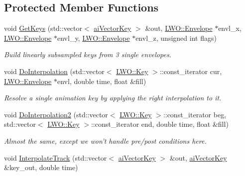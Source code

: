 \subsection*{Protected Member Functions}
\begin{DoxyCompactItemize}
\item 
void \hyperlink{class_assimp_1_1_l_w_o_1_1_anim_resolver_a76d2885a28167f149d5fc10742e60f05}{Get\+Keys} (std\+::vector$<$ \hyperlink{structai_vector_key}{ai\+Vector\+Key} $>$ \&out, \hyperlink{struct_assimp_1_1_l_w_o_1_1_envelope}{L\+W\+O\+::\+Envelope} $\ast$envl\+\_\+x, \hyperlink{struct_assimp_1_1_l_w_o_1_1_envelope}{L\+W\+O\+::\+Envelope} $\ast$envl\+\_\+y, \hyperlink{struct_assimp_1_1_l_w_o_1_1_envelope}{L\+W\+O\+::\+Envelope} $\ast$envl\+\_\+z, unsigned int flags)
\begin{DoxyCompactList}\small\item\em Build linearly subsampled keys from 3 single envelopes. \end{DoxyCompactList}\item 
void \hyperlink{class_assimp_1_1_l_w_o_1_1_anim_resolver_a9af2ed1a4667b425ac46440c182a3f74}{Do\+Interpolation} (std\+::vector$<$ \hyperlink{struct_assimp_1_1_l_w_o_1_1_key}{L\+W\+O\+::\+Key} $>$\+::const\+\_\+iterator cur, \hyperlink{struct_assimp_1_1_l_w_o_1_1_envelope}{L\+W\+O\+::\+Envelope} $\ast$envl, double time, float \&fill)
\begin{DoxyCompactList}\small\item\em Resolve a single animation key by applying the right interpolation to it. \end{DoxyCompactList}\item 
void \hyperlink{class_assimp_1_1_l_w_o_1_1_anim_resolver_a836e5acf927a945537e446b7e61aa5ee}{Do\+Interpolation2} (std\+::vector$<$ \hyperlink{struct_assimp_1_1_l_w_o_1_1_key}{L\+W\+O\+::\+Key} $>$\+::const\+\_\+iterator beg, std\+::vector$<$ \hyperlink{struct_assimp_1_1_l_w_o_1_1_key}{L\+W\+O\+::\+Key} $>$\+::const\+\_\+iterator end, double time, float \&fill)
\begin{DoxyCompactList}\small\item\em Almost the same, except we won't handle pre/post conditions here. \end{DoxyCompactList}\item 
void \hyperlink{class_assimp_1_1_l_w_o_1_1_anim_resolver_a833d3f6bed953d02dbd7b98537521c1b}{Interpolate\+Track} (std\+::vector$<$ \hyperlink{structai_vector_key}{ai\+Vector\+Key} $>$ \&out, \hyperlink{structai_vector_key}{ai\+Vector\+Key} \&key\+\_\+out, double time)

\end{DoxyCompactItemize}
